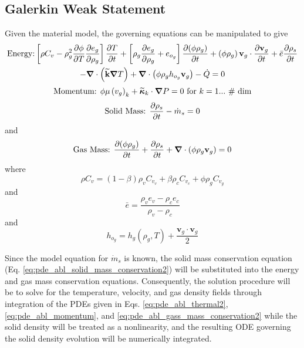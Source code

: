 \subsection{Galerkin Weak Statement}
Given the material model, the governing equations can be manipulated to give
\begin{multline}
  \text{Energy:} \left[\rho C_{v} - \rho_{g}^{2} {\frac{\partial{\phi}}{\partial{T}}}{\frac{\partial{e_{g}}}{\partial{\rho_{g}}}} \right]{\frac{\partial{T}}{\partial{t}}} + \left[ \rho_{g} {\frac{\partial{e_{g}}}{\partial{\rho_{g}}}} + e_{o_{g}} \right]{\frac{\partial{\left(\phi\rho_{g}\right)}}{\partial{t}}} + \left(\phi\rho_{g}\right) \mathbf{v}_{g} \cdot {\frac{\partial{\mathbf{v}_{g}}}{\partial{t}}} + \bar{e}{\frac{\partial{\rho_{s}}}{\partial{t}}}
\\ - {\boldsymbol{\nabla}} {}\cdot\left(\widetilde{\textbf{k}} {\boldsymbol{\nabla}} {T}\right) + {\boldsymbol{\nabla}} {}\cdot\left(\phi \rho_g h_{o_{g}} \textbf{v}_g \right) - \dot{Q} = 0
  \label{eq:pde_abl_thermal2}
\end{multline}
\begin{equation}
  \text{Momentum: } \phi\mu\left(v_{g}\right)_{k} + \widetilde{\boldsymbol{\kappa}}_{k} \cdot {\boldsymbol{\nabla}} {P} = 0 \text{ for $k = 1...$ \# dim}
  \label{eq:pde_abl_momentum}
\end{equation} 
\begin{equation}
  \text{Solid Mass: } {\frac{\partial{\rho_s}}{\partial{t}}} - \dot{m}_s = 0
  \label{eq:pde_abl_solid_mass_conservation2}
\end{equation}
and
\begin{equation}
  \text{Gas Mass: } {\frac{\partial{\left(\phi \rho_g\right)}}{\partial{t}}} + {\frac{\partial{\rho_s}}{\partial{t}}} + {\boldsymbol{\nabla}} {}\cdot\left(\phi \rho_g \mathbf{v}_g \right) = 0
  \label{eq:pde_abl_gass_mass_conservation2}
\end{equation}
where
\begin{equation}
  \rho C_{v} = \left(1 - \beta \right)\rho_{v} C_{v_{v}} + \beta \rho_{c} C_{v_{c}} + \phi \rho_{g} C_{v_{g}}
\end{equation}
and
\begin{equation}
  \bar{e} = \frac{\rho_{v} e_{v} - \rho_{c} e_{c}}{\rho_{v} - \rho_{c}}
\end{equation}
and
\begin{equation}
  h_{o_{g}} = h_{g}\left(\rho_{g},T\right) + \frac{\mathbf{v}_{g} \cdot \mathbf{v}_{g}}{2}
\end{equation}

Since the model equation for $\dot{m}_{s}$ is known, the solid mass conservation equation (Eq. \ref{eq:pde_abl_solid_mass_conservation2}) will be substituted into the energy and gas mass conservation equations.
Consequently, the solution procedure will be to solve for the temperature, velocity, and gas density fields through integration of the PDEs given in Eqs. \ref{eq:pde_abl_thermal2}, \ref{eq:pde_abl_momentum}, and \ref{eq:pde_abl_gass_mass_conservation2}
while the solid density will be treated as a nonlinearity, and the resulting ODE governing the solid density evolution will be numerically integrated.
